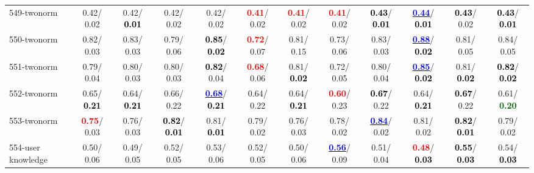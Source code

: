 \begin{table}[h]
\begin{center}
{\begin{tabular}{lc|c|c|c|c|c|c|c|c|c|c}
549-twonorm &   0.42/  0.02 &   0.42/\textcolor{black}{\textbf{  0.01}} &   0.42/  0.02 &   0.42/  0.02 & \textcolor{red}{\textbf{  0.41}}/  0.02 & \textcolor{red}{\textbf{  0.41}}/  0.02 & \textcolor{red}{\textbf{  0.41}}/  0.02 & \textcolor{black}{\textbf{  0.43}}/\textcolor{black}{\textbf{  0.01}} & \underline{\textcolor{blue}{\textbf{  0.44}}}/\textcolor{black}{\textbf{  0.01}} & \textcolor{black}{\textbf{  0.43}}/  0.02 & \textcolor{black}{\textbf{  0.43}}/\textcolor{black}{\textbf{  0.01}} \\
550-twonorm &   0.82/  0.03 &   0.83/  0.03 &   0.79/  0.06 & \textcolor{black}{\textbf{  0.85}}/\textcolor{black}{\textbf{  0.02}} & \textcolor{red}{\textbf{  0.72}}/  0.07 &   0.81/  0.15 &   0.73/  0.06 &   0.83/  0.03 & \underline{\textcolor{blue}{\textbf{  0.88}}}/\textcolor{black}{\textbf{  0.02}} &   0.81/  0.05 &   0.84/  0.05 \\
551-twonorm &   0.79/  0.04 &   0.80/  0.03 &   0.80/  0.03 & \textcolor{black}{\textbf{  0.82}}/  0.04 & \textcolor{red}{\textbf{  0.68}}/  0.06 &   0.81/\textcolor{black}{\textbf{  0.02}} &   0.72/  0.05 &   0.80/  0.04 & \underline{\textcolor{blue}{\textbf{  0.85}}}/\textcolor{black}{\textbf{  0.02}} &   0.81/\textcolor{black}{\textbf{  0.02}} & \textcolor{black}{\textbf{  0.82}}/\textcolor{black}{\textbf{  0.02}} \\ \hline
552-twonorm &   0.65/\textcolor{black}{\textbf{  0.21}} &   0.64/\textcolor{black}{\textbf{  0.21}} &   0.66/  0.22 & \underline{\textcolor{blue}{\textbf{  0.68}}}/\textcolor{black}{\textbf{  0.21}} &   0.64/  0.22 &   0.64/\textcolor{black}{\textbf{  0.21}} & \textcolor{red}{\textbf{  0.60}}/  0.23 & \textcolor{black}{\textbf{  0.67}}/  0.22 &   0.64/\textcolor{black}{\textbf{  0.21}} & \textcolor{black}{\textbf{  0.67}}/  0.22 &   0.61/\textcolor{darkgreen}{\textbf{  0.20}} \\
553-twonorm & \textcolor{red}{\textbf{  0.75}}/  0.03 &   0.76/  0.03 & \textcolor{black}{\textbf{  0.82}}/\textcolor{black}{\textbf{  0.01}} &   0.81/\textcolor{black}{\textbf{  0.01}} &   0.79/  0.02 &   0.76/  0.03 &   0.78/  0.02 & \underline{\textcolor{blue}{\textbf{  0.84}}}/  0.02 &   0.81/  0.02 & \textcolor{black}{\textbf{  0.82}}/\textcolor{black}{\textbf{  0.01}} &   0.79/  0.02 \\
554-user knowledge &   0.50/  0.06 &   0.49/  0.05 &   0.52/  0.05 &   0.53/  0.06 &   0.52/  0.05 &   0.50/  0.06 & \underline{\textcolor{blue}{\textbf{  0.56}}}/  0.09 &   0.51/  0.04 & \textcolor{red}{\textbf{  0.48}}/\textcolor{black}{\textbf{  0.03}} & \textcolor{black}{\textbf{  0.55}}/\textcolor{black}{\textbf{  0.03}} &   0.54/\textcolor{black}{\textbf{  0.03}} \\

\end{tabular}}
\end{center}
\end{table}
